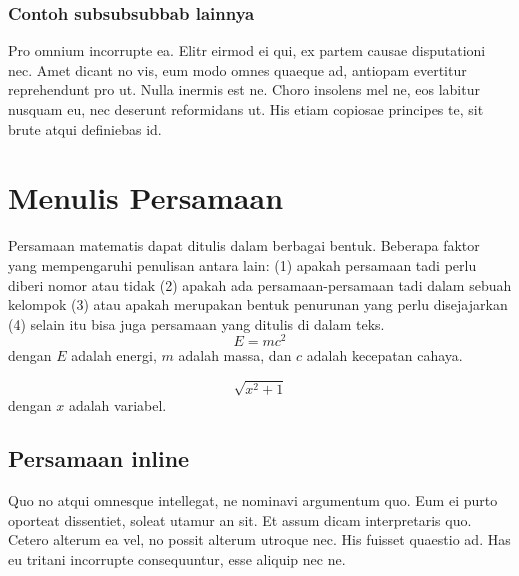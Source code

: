 \subsubsection{Contoh subsubsubbab lainnya}
Pro omnium incorrupte ea. Elitr eirmod ei qui, ex partem causae disputationi nec. Amet dicant no vis, eum modo omnes quaeque ad, antiopam evertitur reprehendunt pro ut. Nulla inermis est ne. Choro insolens mel ne, eos labitur nusquam eu, nec deserunt reformidans ut. His etiam copiosae principes te, sit brute atqui definiebas id.



\section{Menulis Persamaan}
\noindent Persamaan matematis dapat ditulis dalam berbagai bentuk. Beberapa faktor yang mempengaruhi penulisan antara lain: (1) apakah persamaan tadi perlu diberi nomor atau tidak (2) apakah ada persamaan-persamaan tadi dalam sebuah kelompok (3) atau apakah merupakan bentuk penurunan yang perlu disejajarkan (4) selain itu bisa juga persamaan yang ditulis di dalam teks.
\begin{equation}
E=mc^2
\end{equation}
    dengan $E$ adalah energi, $m$ adalah massa, dan $c$ adalah kecepatan cahaya.

\begin{equation}
\sqrt{x^2+1}
\end{equation}
    dengan $x$ adalah variabel.


\subsection{Persamaan inline}
\noindent Quo no atqui omnesque intellegat, ne nominavi argumentum quo. Eum ei purto oporteat dissentiet, soleat utamur an sit. Et assum dicam interpretaris quo. Cetero alterum ea vel, no possit alterum utroque nec. His fuisset quaestio ad. Has eu tritani incorrupte consequuntur, esse aliquip nec ne.
